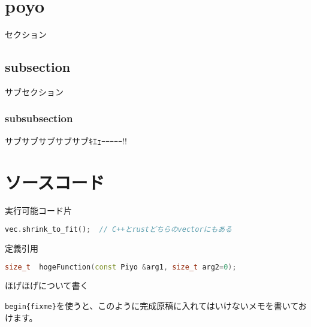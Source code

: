 \documentclass[../book.tex]{subfiles}
\begin{document}
\label{14-poyotaro:ch:create-poyopoyo}

\section{poyo}
    セクション

    \subsection{subsection}
        サブセクション

        \subsubsection{subsubsection}
            サブサブサブサブサブｷｴｪｰｰｰｰｰ!!

\section{ソースコード}

    実行可能コード片

    \noindent\begin{minipage}{\textwidth}\mbox{}
\begin{lstlisting}[language=rust,style=code,caption={コードの例}]
vec.shrink_to_fit();  // C++とrustどちらのvectorにもある
\end{lstlisting}%
    \end{minipage}

    定義引用

    \noindent\begin{minipage}{\textwidth}\mbox{}
\begin{lstlisting}[language=c++,style=decleration,caption={宣言の例}]
size_t  hogeFunction(const Piyo &arg1, size_t arg2=0);
\end{lstlisting}%
    \end{minipage}

    \begin{fixme}
        ほげほげについて書く

        \lstinline[language=tex]|begin{fixme}|を使うと、このように完成原稿に入れてはいけないメモを書いておけます。
    \end{fixme}
\end{document}
